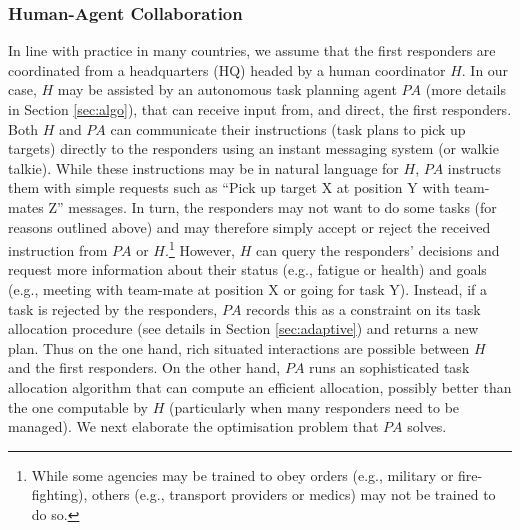 %
\subsubsection{Human-Agent Collaboration}
\noindent In line with practice in many countries, we assume that the first responders are coordinated from a headquarters (HQ) headed by a human coordinator $H$. In our case, $H$ may be assisted by an autonomous task planning agent $PA$ (more details in Section \ref{sec:algo}), that can receive input from, and direct, the first responders.   Both  $H$ and $PA$  can communicate their  instructions (task plans to pick up targets) directly to the responders using an instant messaging system (or walkie talkie).  While these instructions may be in natural language for $H$, $PA$ instructs them with simple requests such as ``Pick up target X at position Y with team-mates Z'' messages. In turn, the responders may not want to do some tasks (for reasons outlined above) and may therefore simply accept or reject the received instruction from $PA$ or $H$.\footnote{While some agencies may be trained to obey orders (e.g., military or fire-fighting), others (e.g., transport providers or medics) may not be trained to do so.} However, $H$ can query the responders' decisions and request  more information about their status (e.g., fatigue or health) and goals (e.g., meeting with team-mate at position X or going for task Y). Instead, if a task is rejected by the responders, $PA$ records this as a constraint on its task allocation procedure (see details in Section \ref{sec:adaptive}) and returns a new plan. Thus on the one hand, rich situated interactions are possible between $H$ and the first responders. On the other hand, $PA$ runs an sophisticated task allocation algorithm that can compute an efficient allocation, possibly better than the one computable by $H$ (particularly when many responders need to be managed). We next elaborate the optimisation problem that $PA$ solves.

